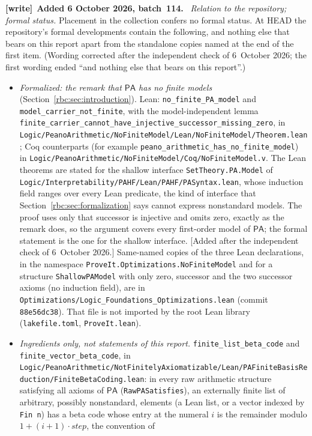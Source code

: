 \documentclass[11pt]{article}
\numberwithin{equation}{section}
\theoremstyle{definition}
\theoremstyle{remark}
\newcommand{\PA}{\mathsf{PA}}
\newcommand{\file}[1]{\nolinkurl{#1}}
\newenvironment{writenote}[1][]{\par\smallskip\begingroup\small
 \noindent\textbf{[write]}\if\relax\detokenize{#1}\relax\else~\textbf{#1.}\fi\ }%
 {\par\endgroup\smallskip}
\begin{document}
\begin{writenote}[Added 6 October 2026, batch~114]
\emph{Relation to the repository; formal status.} Placement in the
collection confers no formal status. At HEAD the repository's formal
developments contain the following, and nothing else that bears on this
report apart from the standalone copies named at the end of the first item.
\textup{(Wording corrected after the independent check of 6~October 2026;
the first wording ended ``and nothing else that bears on this report''.)}
\begin{itemize}\raggedright
\item \emph{Formalized: the remark that $\PA$ has no finite models}
 (Section~\ref{rbc:sec:introduction}). Lean: \file{no_finite_PA_model} and
 \file{model_carrier_not_finite}, with the model-independent lemma
 \file{finite_carrier_cannot_have_injective_successor_missing_zero}, in
 \file{Logic/PeanoArithmetic/NoFiniteModel/Lean/NoFiniteModel/Theorem.lean};
 Coq counterparts (for example \file{peano_arithmetic_has_no_finite_model})
 in \file{Logic/PeanoArithmetic/NoFiniteModel/Coq/NoFiniteModel.v}. The Lean
 theorems are stated for the shallow interface \file{SetTheory.PA.Model} of
 \file{Logic/Interpretability/PAHF/Lean/PAHF/PASyntax.lean}, whose induction
 field ranges over every Lean predicate, the kind of interface that
 Section~\ref{rbc:sec:formalization} says cannot express nonstandard models.
 The proof uses only that successor is injective and omits zero, exactly as
 the remark does, so the argument covers every first-order model of $\PA$;
 the formal statement is the one for the shallow interface.
 \textup{[Added after the independent check of 6~October 2026.]}
 Same-named copies of the three Lean declarations, in the namespace
 \file{ProveIt.Optimizations.NoFiniteModel} and for a structure
 \file{ShallowPAModel} with only zero, successor and the two successor
 axioms (no induction field), are in
 \file{Optimizations/Logic_Foundations_Optimizations.lean} (commit
 \file{88e56dc38}). That file is not imported by the root Lean library
 (\file{lakefile.toml}, \file{ProveIt.lean}).
\item \emph{Ingredients only, not statements of this report.}
 \file{finite_list_beta_code} and \file{finite_vector_beta_code}, in
 \file{Logic/PeanoArithmetic/NotFinitelyAxiomatizable/Lean/PAFiniteBasisReduction/FiniteBetaCoding.lean}:
 in every raw arithmetic structure satisfying all axioms of $\PA$
 (\file{RawPASatisfies}), an externally finite list of arbitrary, possibly
 nonstandard, elements (a Lean list, or a vector indexed by
 \file{Fin n}) has a beta code whose entry at the numeral $i$ is the
 remainder modulo $1+(i+1)\cdot\mathit{step}$, the convention of

\end{itemize}
\end{writenote}
\end{document}
